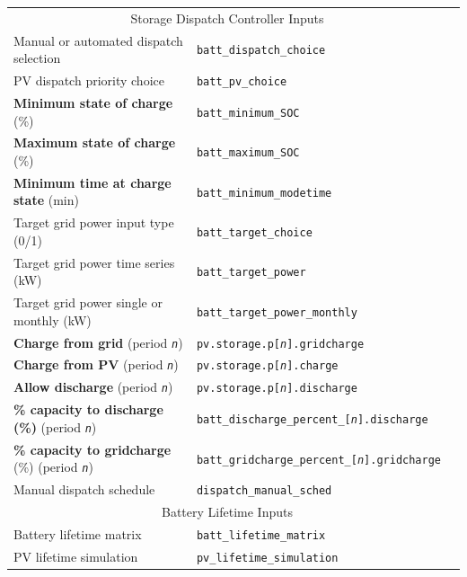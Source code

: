\documentclass[12pt,letterpaper]{article}
\begin{document}
\begin{table}
\begin{center}
\begin{tabular}{lll}
\midrule
\multicolumn{2}{c}{Storage Dispatch Controller Inputs}\\
Manual or automated dispatch selection & \texttt{batt\_dispatch\_choice} \\
PV dispatch priority choice & \texttt{batt\_pv\_choice} \\
\textbf{Minimum state of charge} (\%) & \texttt{batt\_minimum\_SOC} \\
\textbf{Maximum state of charge} (\%) & \texttt{batt\_maximum\_SOC} \\
\textbf{Minimum time at charge state} (min) & \texttt{batt\_minimum\_modetime} \\
Target grid power input type (0/1) & \texttt{batt\_target\_choice}\\
Target grid power time series (kW) & \texttt{batt\_target\_power}\\
Target grid power single or monthly (kW) & \texttt{batt\_target\_power\_monthly}\\
\textbf{Charge from grid} (period \texttt{\textit{n}}) & \texttt{pv.storage.p[\textit{n}].gridcharge} \\
\textbf{Charge from PV} (period \texttt{\textit{n}}) & \texttt{pv.storage.p[\textit{n}].charge} \\
\textbf{Allow discharge} (period \texttt{\textit{n}}) & \texttt{pv.storage.p[\textit{n}].discharge} \\
\textbf{\% capacity to discharge (\%)} (period \texttt{\textit{n}}) & \texttt{batt\_discharge\_percent\_[\textit{n}].discharge} \\
\textbf{\% capacity to gridcharge} (\%) (period \texttt{\textit{n}}) & \texttt{batt\_gridcharge\_percent\_[\textit{n}].gridcharge} \\
Manual dispatch schedule & \texttt{dispatch\_manual\_sched} \\
\midrule
\multicolumn{2}{c}{Battery Lifetime Inputs}\\
Battery lifetime matrix & \texttt{batt\_lifetime\_matrix} \\
PV lifetime simulation & \texttt{pv\_lifetime\_simulation} \\
\hline
\end{tabular}
\label{tab-batteryinputs}
\end{center}
\end{table}
\end{document}
